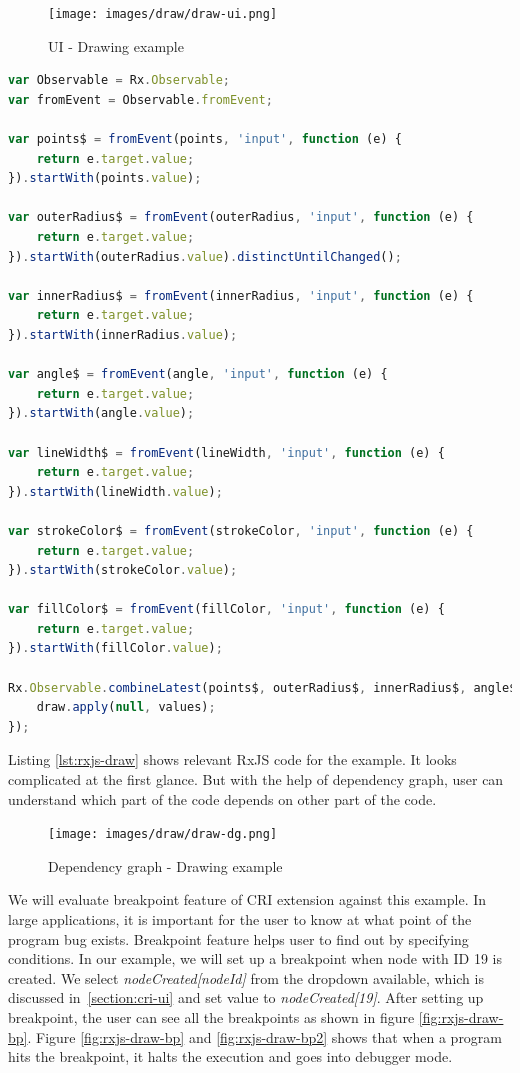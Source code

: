 \begin{figure}[!h]
	\centering
	\texttt{[image: images/draw/draw-ui.png]}
	\caption{UI - Drawing example}
	\label{fig:rxjs-draw-ui}
\end{figure}

\begin{lstlisting}[language=JavaScript, caption=RxJS - Drawing example, label={lst:rxjs-draw}]
var Observable = Rx.Observable;
var fromEvent = Observable.fromEvent;

var points$ = fromEvent(points, 'input', function (e) {
	return e.target.value;
}).startWith(points.value);

var outerRadius$ = fromEvent(outerRadius, 'input', function (e) {
	return e.target.value;
}).startWith(outerRadius.value).distinctUntilChanged();

var innerRadius$ = fromEvent(innerRadius, 'input', function (e) {
	return e.target.value;
}).startWith(innerRadius.value);

var angle$ = fromEvent(angle, 'input', function (e) {
	return e.target.value;
}).startWith(angle.value);

var lineWidth$ = fromEvent(lineWidth, 'input', function (e) {
	return e.target.value;
}).startWith(lineWidth.value);

var strokeColor$ = fromEvent(strokeColor, 'input', function (e) {
	return e.target.value;
}).startWith(strokeColor.value);

var fillColor$ = fromEvent(fillColor, 'input', function (e) {
	return e.target.value;
}).startWith(fillColor.value);

Rx.Observable.combineLatest(points$, outerRadius$, innerRadius$, angle$, strokeColor$, fillColor$, lineWidth$).subscribe(function (values) {
	draw.apply(null, values);
});

\end{lstlisting}

Listing \ref{lst:rxjs-draw} shows relevant RxJS code for the example. It looks complicated at the first glance. But with the help of dependency graph, user can understand which part of the code depends on other part of the code. 

\begin{figure}[!h]
	\centering
	\texttt{[image: images/draw/draw-dg.png]}
	\caption{Dependency graph - Drawing example}
	\label{fig:rxjs-draw-dg}
\end{figure}

We will evaluate breakpoint feature of CRI extension against this example. In large applications, it is important for the user to know at what point of the program bug exists. Breakpoint feature helps user to find out by specifying conditions. In our example, we will set up a breakpoint when node with ID 19 is created. We select \textit{nodeCreated[nodeId]} from the dropdown available, which is discussed in~\ref{section:cri-ui} and set value to \textit{nodeCreated[19]}. After setting up breakpoint, the user can see all the breakpoints as shown in figure \ref{fig:rxjs-draw-bp}. Figure \ref{fig:rxjs-draw-bp} and \ref{fig:rxjs-draw-bp2} shows that when a program hits the breakpoint, it halts the execution and goes into debugger mode. 


